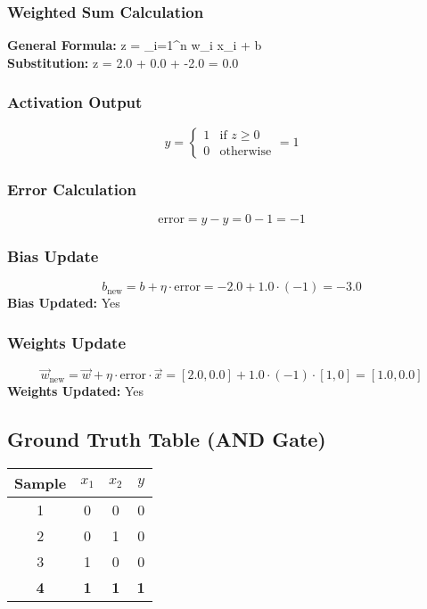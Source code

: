\documentclass{article}
\begin{document}
\subsubsection*{Weighted Sum Calculation}
\textbf{General Formula:} \quad
z = \sum_{i=1}^{n} w_i x_i + b
\\
\textbf{Substitution:} \quad
z = 2.0  + 0.0  + -2.0 = 0.0

\subsubsection*{Activation Output}
\[
\hat{y} =
\begin{cases}
1 & \text{if } z \geq 0 \\
0 & \text{otherwise}
\end{cases}
= 1
\]

\subsubsection*{Error Calculation}
\[
\text{error} = y - \hat{y} = 0 - 1 = -1
\]

\subsubsection*{Bias Update}
\[
b_{\text{new}} = b + \eta \cdot \text{error} = -2.0 + 1.0 \cdot (-1) = -3.0
\]
\textbf{Bias Updated:} Yes

\subsubsection*{Weights Update}
\[
\vec{w}_{\text{new}} = \vec{w} + \eta \cdot \text{error} \cdot \vec{x} = 
[2.0, 0.0] + 1.0 \cdot (-1) \cdot [1, 0] = 
[1.0, 0.0]
\]
\textbf{Weights Updated:} Yes

\subsection*{Ground Truth Table (AND Gate)}
\begin{center}
\begin{tabular}{|c|c|c|c|}
\hline
\textbf{Sample} & $x_1$ & $x_2$ & $y$ \\
\hline
1 & 0 & 0 & 0 \\
\hline
2 & 0 & 1 & 0 \\
\hline
3 & 1 & 0 & 0 \\
\hline
\rowcolor{yellow} \textbf{4} & \textbf{1} & \textbf{1} & \textbf{1} \\
\hline
\end{tabular}
\end{center}
\end{document}
